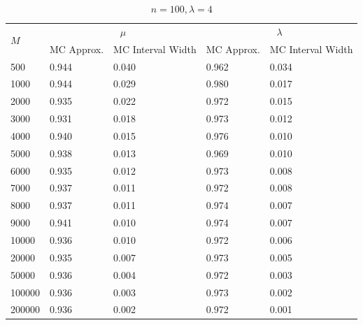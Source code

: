 \documentclass{article}
\begin{document}
       \begin{table}[!htb]
       \ContinuedFloat

		\begin{subtable}[b]{\textwidth}
		\centering
		\begin{tabular}{l|ll|ll}
		\toprule
        \multirow{2}{*}{$M$} & \multicolumn{2}{c|}{$\mu$}      & \multicolumn{2}{c}{$\lambda$}  \\ 
                           & MC Approx. & MC Interval Width & MC Approx. & MC Interval Width \\
                           \midrule
        500    &0.944 &0.040 &0.962 &0.034\\
        1000   &0.944 &0.029 &0.980 &0.017\\
        2000   &0.935 &0.022 &0.972 &0.015\\
        3000   &0.931 &0.018 &0.973 &0.012\\
        4000   &0.940 &0.015 &0.976 &0.010\\
        5000   &0.938 &0.013 &0.969 &0.010\\
        6000   &0.935 &0.012 &0.973 &0.008\\
        7000   &0.937 &0.011 &0.972 &0.008\\
        8000   &0.937 &0.011 &0.974 &0.007\\
        9000   &0.941 &0.010 &0.974 &0.007\\
        10000  &0.936 &0.010 &0.972 &0.006\\
        20000  &0.935 &0.007 &0.973 &0.005\\
        50000  &0.936 &0.004 &0.972 &0.003\\
        100000 &0.936 &0.003 &0.973 &0.002\\
        200000 &0.936 &0.002 &0.972 &0.001\\
       \bottomrule
       \end{tabular}
       \caption{$n = 100, \lambda = 4$}
       \end{subtable}%


\end{table}
\end{document}
